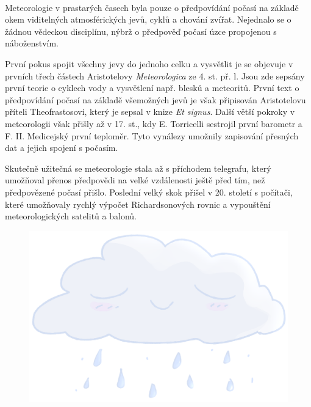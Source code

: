 \documentclass[11pt]{article}
\begin{document}
\paragraph{}
Meteorologie v prastarých časech byla pouze o předpovídání počasí na základě okem viditelných atmosférických jevů, cyklů a chování zvířat. Nejednalo se o žádnou vědeckou disciplínu, nýbrž o předpověď počasí úzce propojenou s náboženstvím.
%
\par
První pokus spojit všechny jevy do jednoho celku a vysvětlit je se objevuje v prvních třech částech Aristotelovy \textit{Meteorologica} ze 4. st. př. l. Jsou zde sepsány první teorie o cyklech vody a vysvětlení např. blesků a meteoritů. První text o předpovídání počasí na základě všemožných jevů je však připisován Aristotelovu příteli Theofrastosovi, který je sepsal v knize \textit{Et signus}. Další větší pokroky v meteorologii však přišly až v 17. st., kdy E. Torricelli sestrojil první barometr a F. II. Medicejský první teploměr. Tyto vynálezy umožnily zapisování přesných dat a jejich spojení s počasím.
\par
Skutečně užitečná se meteorologie stala až s příchodem telegrafu, který umožňoval přenos předpovědi na velké vzdálenosti ještě před tím, než předpovězené počasí přišlo. Poslední velký skok přišel v 20. století s počítači, které umožňovaly rychlý výpočet Richardsonových rovnic a vypouštění meteorologických satelitů a balonů.

\begin{figure}[!tbh]
    \centering
    \href{https://www.youtube.com/watch?v=dQw4w9WgXcQ}{\includegraphics[scale=0.38]{resources/mrak2.png}}
\end{figure}
\newpage
\end{document}
